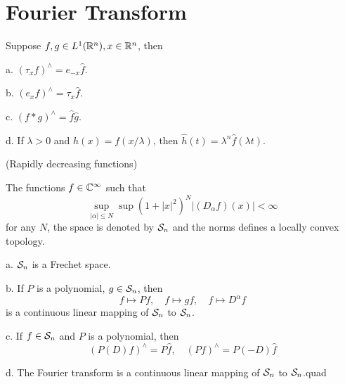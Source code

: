 \chapter{Fourier Transform}

\begin{theorem}
    Suppose $f,g \in L^1(\mathbb{R}^n), x\in \mathbb{R}^n$, then\par
    a. $(\tau_x f)^{\wedge} = e_{-x}\hat{f}$.\par
    b. $(e_x f)^{\wedge} = \tau_x\hat{f}$.\par
    c. $(f*g)^{\wedge} = \hat{f}\hat{g}$.\par
    d. If $\lambda > 0$ and $h(x) = f(x/\lambda)$, then $\hat{h}(t) = \lambda^n\hat{f}(\lambda t)$.
\end{theorem}

\begin{definition}
    (Rapidly decreasing functions)\par
    The functions $f\in\mathbb{C}^{\infty}$ such that
    \[
    \sup_{|\alpha| \leq N}\sup(1+|x|^2)^N|(D_{\alpha} f)(x)| < \infty
    \]
    for any $N$, the space is denoted by $\mathcal{S}_n$ and the norms defines a locally convex topology.
\end{definition}

\begin{theorem}
    a. $\mathcal{S}_n$ is a Frechet space.\par
    b. If $P$ is a polynomial, $g\in \mathcal{S}_n$, then
    \[f\mapsto Pf,\quad f\mapsto gf,\quad f\mapsto D^{\alpha}f\]
    is a continuous linear mapping of $\mathcal{S}_n$ to $\mathcal{S}_n$.\par
    c. If $f\in \mathcal{S}_n$ and $P$ is a polynomial, then
    \[
    (P(D)f)^{\wedge} = P\hat{f},\quad (Pf)^{\wedge} = P(-D)\hat{f}
    \]\par
    d. The Fourier transform is a continuous linear mapping of $\mathcal{S}_n$ to $\mathcal{S}_n$.quad
\end{theorem}
